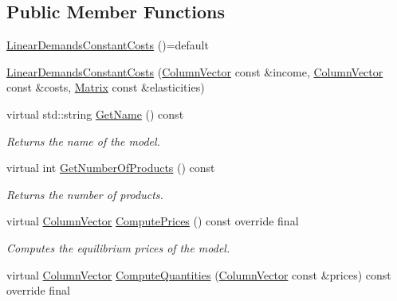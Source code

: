 \subsection*{Public Member Functions}
\begin{DoxyCompactItemize}
\item 
\hyperlink{classLinearDemandsConstantCosts_a79e3cc71f551a3ad3ecfd5ea3818a6c0}{Linear\+Demands\+Constant\+Costs} ()=default
\item 
\hyperlink{classLinearDemandsConstantCosts_a0a7e9c271148594fdc0e4024cfd521a9}{Linear\+Demands\+Constant\+Costs} (\hyperlink{classColumnVector}{Column\+Vector} const \&income, \hyperlink{classColumnVector}{Column\+Vector} const \&costs, \hyperlink{classMatrix}{Matrix} const \&elasticities)
\item 
\mbox{\label{classLinearDemandsConstantCosts_a5b137f8fe14c712fba111a5ddb62ca49}} 
virtual std\+::string \hyperlink{classLinearDemandsConstantCosts_a5b137f8fe14c712fba111a5ddb62ca49}{Get\+Name} () const
\begin{DoxyCompactList}\small\item\em Returns the name of the model. \end{DoxyCompactList}\item 
\mbox{\label{classLinearDemandsConstantCosts_a05de34331dce8d63ebf778d3436780ba}} 
virtual int \hyperlink{classLinearDemandsConstantCosts_a05de34331dce8d63ebf778d3436780ba}{Get\+Number\+Of\+Products} () const
\begin{DoxyCompactList}\small\item\em Returns the number of products. \end{DoxyCompactList}\item 
\mbox{\label{classLinearDemandsConstantCosts_ae2f4565860b89a5576b54884a4d520d1}} 
virtual \hyperlink{classColumnVector}{Column\+Vector} \hyperlink{classLinearDemandsConstantCosts_ae2f4565860b89a5576b54884a4d520d1}{Compute\+Prices} () const override final
\begin{DoxyCompactList}\small\item\em Computes the equilibrium prices of the model. \end{DoxyCompactList}\item 
virtual \hyperlink{classColumnVector}{Column\+Vector} \hyperlink{classLinearDemandsConstantCosts_a310864e458935098502561540a71a88c}{Compute\+Quantities} (\hyperlink{classColumnVector}{Column\+Vector} const \&prices) const override final

\end{DoxyCompactItemize}
